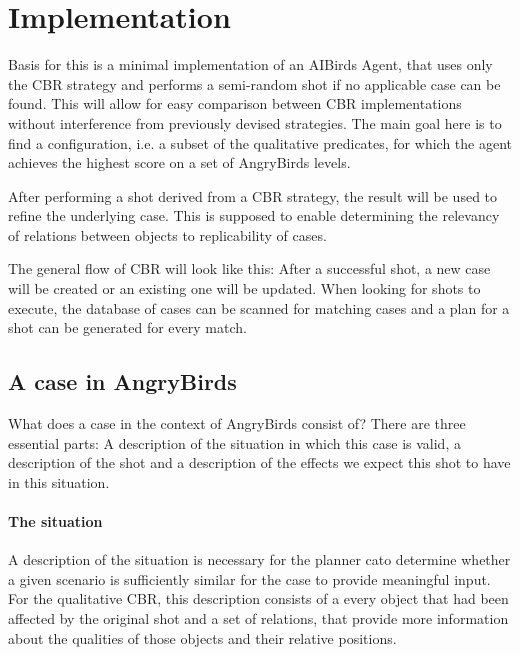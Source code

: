 \section{Implementation}\label{sec:implementation}

Basis for this is a minimal implementation of an AIBirds Agent, that uses only the CBR strategy and performs a semi-random shot if no applicable case can be found.
This will allow for easy comparison between CBR implementations without interference from previously devised strategies.
The main goal here is to find a configuration, i.e. a subset of the qualitative predicates, for which the agent achieves the highest score on a set of AngryBirds levels.

After performing a shot derived from a CBR strategy, the result will be used to refine the underlying case.
This is supposed to enable determining the relevancy of relations between objects to replicability of cases.

The general flow of CBR will look like this: After a successful shot, a new case will be created or an existing one will be updated. When looking for shots to execute, the database of cases can be scanned for matching cases and a plan for a shot can be generated for every match.



\subsection{A case in AngryBirds}\label{subsec:impl-case}
What does a case in the context of AngryBirds consist of? There are three essential parts: A description of the situation in which this case is valid, a description of the shot and a description of the effects we expect this shot to have in this situation.

\paragraph{The situation}
A description of the situation is necessary for the planner cato determine whether a given scenario is sufficiently similar for the case to provide meaningful input.
For the qualitative CBR, this description consists of a every object that had been affected by the original shot and a set of relations, that provide more information about the qualities of those objects and their relative positions.



